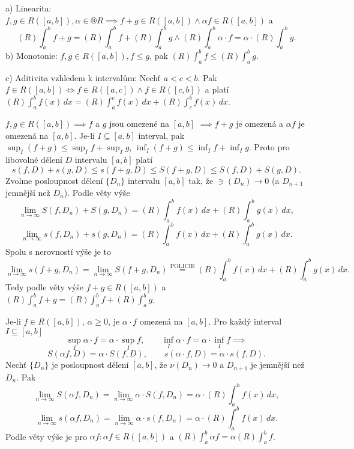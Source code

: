 \documentclass[12pt]{article}                   %
\begin{document}
        \begin{veta}
            a) Linearita: $f, g \in R([a, b]), \alpha \in ®R \implies f+g \in R([a, b]) \land \alpha f \in R([a, b])$ a 
            $$ (R) \int_a^b f + g = (R) \int_a^b f + (R) \int_a^b g \land (R) \int_a^b \alpha·f = \alpha·(R) \int_a^b g. $$
            b) Monotonie: $f, g \in R([a, b]), f ≤ g$, pak $(R) \int_a^b f ≤ (R) \int_a^b g$.

            c) Aditivita vzhledem k intervalům: Nechť $a < c < b$. Pak $f\in R([a, b]) \Leftrightarrow f \in R([a, c]) \land f \in R([c, b])$ a platí $(R) \int_a^b f(x)\,dx = (R) \int_a^c f(x)\,dx + (R) \int_c^b f(x)\,dx$.

            \begin{dukazin}[a]
                $f, g \in R([a, b]) \implies f$ a $g$ jsou omezené na $[a, b]$ $\implies f + g$ je omezená a $\alpha f$ je omezená na $[a, b]$. Je-li $I \subseteq [a, b]$ interval, pak $\sup_I(f+g) ≤ \sup_I f + \sup_I g$, $\inf_I(f+g) ≤ \inf_I f + \inf_I g$. Proto pro libovolné dělení $D$ intervalu $[a, b]$ platí
                $$ s(f, D) + s(g, D) ≤ s(f + g, D) ≤ S(f + g, D) ≤ S(f, D) + S(g, D). $$
                Zvolme posloupnost dělení $\{D_n\}$ intervalu $[a, b]$ tak, že $\ni(D_n) \rightarrow 0$ (a $D_{n+1}$ jemnější než $D_n$). Podle věty výše
                $$ \lim_{n \rightarrow ∞} S(f, D_n) + S(g, D_n) = (R) \int_a^b f(x)\,dx + (R) \int_a^b g(x)\,dx, $$
                $$ \lim_{n \rightarrow ∞} s(f, D_n) + s(g, D_n) = (R) \int_a^b f(x)\,dx + (R) \int_a^b g(x)\,dx. $$
                Spolu s nerovností výše je to
                $$ \lim_{n \rightarrow ∞} s(f+g, D_n) = \lim_{n \rightarrow ∞} S(f + g, D_n) \overset{\text{POLICIE}}{=} (R) \int_a^b f(x)\,dx + (R) \int_a^b g(x)\,dx. $$
                Tedy podle věty výše $f+g \in R([a, b])$ a $(R) \int_a^b f + g = (R) \int_a^b f + (R) \int_a^b g$.

                Je-li $f \in R([a, b])$, $\alpha ≥ 0$, je $\alpha·f$ omezená na $[a, b]$. Pro každý interval $I \subseteq [a, b]$
                $$ \sup_I \alpha·f = \alpha·\sup_I f, \qquad \inf_I \alpha·f = \alpha·\inf_I f \implies $$
                $$ S(\alpha f, D) = \alpha·S(f, D), \qquad s(\alpha·f, D) = \alpha·s(f, D). $$
                Nechť $\{D_n\}$ je posloupnost dělení $[a, b]$, že $\nu(D_n) \rightarrow 0$ a $D_{n+1}$ je jemnější než $D_n$. Pak
                $$ \lim_{n \rightarrow ∞} S(\alpha f, D_n) = \lim_{n \rightarrow ∞} \alpha·S(f, D_n) = \alpha·(R) \int_a^b f(x)\,dx, $$
                $$ \lim_{n \rightarrow ∞} s(\alpha f, D_n) = \lim_{n \rightarrow ∞} \alpha·s(f, D_n) = \alpha·(R) \int_a^b f(x)\,dx. $$
                Podle věty výše je pro $\alpha f: \alpha f \in R([a, b])$ a $(R)\int_a^b \alpha f = \alpha (R)\int_a^b f$.


\end{dukazin}
\end{veta}
\end{document}
